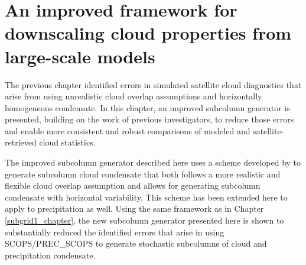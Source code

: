 \chapter{An improved framework for downscaling cloud properties from large-scale models}\label{subgrid2_chapter}
The previous chapter identified errors in simulated satellite cloud diagnostics that arise from using unrealistic cloud overlap assumptions and horizontally homogeneous condensate. In this chapter, an improved subcolumn generator is presented, building on the work of previous investigators, to reduce those errors and enable more consistent and robust comparisons of modeled and satellite-retrieved cloud statistics. 

The improved subcolumn generator described here uses a scheme developed by \cite{raisanen_et_al_2004} to generate subcolumn cloud condensate that both follows a more realistic and flexible cloud overlap assumption and allows for generating subcolumn condensate with horizontal variability. This scheme has been extended here to apply to precipitation as well. Using the same framework as in Chapter \ref{subgrid1_chapter}, the new subcolumn generator presented here is shown to substantially reduced the identified errors that arise in using SCOPS/PREC\_SCOPS to generate stochastic subcolumns of cloud and precipitation condensate.


